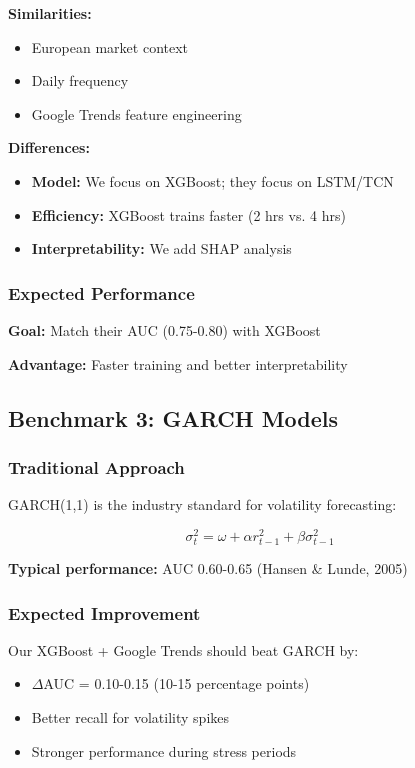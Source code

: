 \documentclass[12pt,a4paper]{article}
\begin{document}
\textbf{Similarities:}
\begin{itemize}
    \item European market context
    \item Daily frequency
    \item Google Trends feature engineering
\end{itemize}

\textbf{Differences:}
\begin{itemize}
    \item \textbf{Model:} We focus on XGBoost; they focus on LSTM/TCN
    \item \textbf{Efficiency:} XGBoost trains faster (2 hrs vs. 4 hrs)
    \item \textbf{Interpretability:} We add SHAP analysis
\end{itemize}

\subsubsection{Expected Performance}

\textbf{Goal:} Match their AUC (0.75-0.80) with XGBoost

\textbf{Advantage:} Faster training and better interpretability

\subsection{Benchmark 3: GARCH Models}

\subsubsection{Traditional Approach}

GARCH(1,1) is the industry standard for volatility forecasting:

\begin{equation}
\sigma_t^2 = \omega + \alpha r_{t-1}^2 + \beta \sigma_{t-1}^2
\end{equation}

\textbf{Typical performance:} AUC 0.60-0.65 (Hansen \& Lunde, 2005)

\subsubsection{Expected Improvement}

Our XGBoost + Google Trends should beat GARCH by:
\begin{itemize}
    \item $\Delta$AUC = 0.10-0.15 (10-15 percentage points)
    \item Better recall for volatility spikes
    \item Stronger performance during stress periods
\end{itemize}
\end{document}
